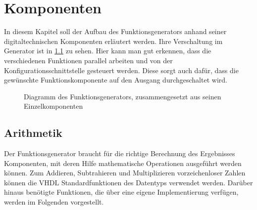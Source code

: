 \chapter{Komponenten}
In diesem Kapitel soll der Aufbau des Funktionsgenerators anhand seiner
digitaltechnischen Komponenten erläutert werden.
Ihre Verschaltung im Generator ist in \cref{Comp:FuncGenDia} zu sehen.
Hier kann man gut erkennen, dass die verschiedenen Funktionen parallel arbeiten und von der Konfigurationsschnittstelle gesteuert werden.
Diese sorgt auch dafür, dass die gewünschte Funktionskomponente auf den Ausgang durchgeschaltet wird.

\begin{figure}[h]
  
  \caption{Diagramm des Funktionsgenerators, zusammengesetzt aus seinen Einzelkomponenten}  \label{Comp:FuncGenDia}
\end{figure}

\section{Arithmetik}
Der Funktionsgenerator braucht für die richtige Berechnung des Ergebnisses Komponenten, mit deren Hilfe mathematische Operationen ausgeführt werden können.
Zum Addieren, Subtrahieren und Multiplizieren vorzeichenloser Zahlen können die VHDL Standardfunktionen des Datentyps  verwendet werden.
Darüber hinaus benötigte Funktionen, die über eine eigene Implementierung verfügen, werden im Folgenden vorgestellt.

